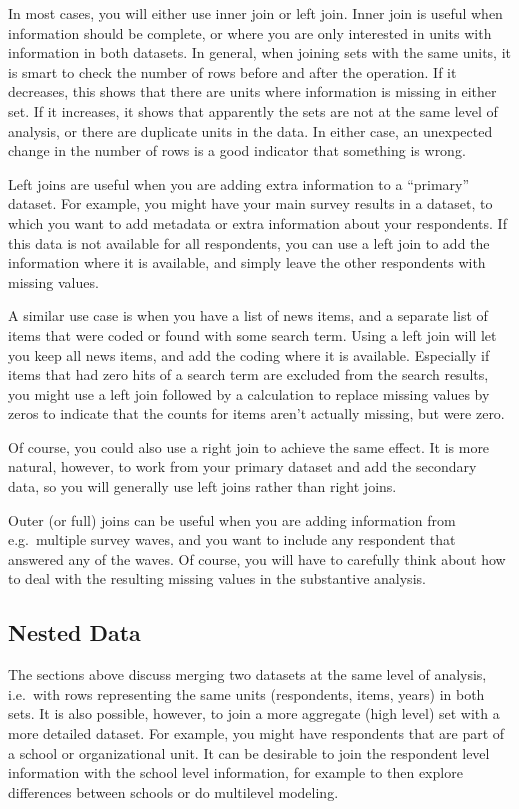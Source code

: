 In most cases, you will either use inner join or left join.
Inner join is useful when information should be complete,
or where you are only interested in units with information in both datasets.
In general, when joining sets with the same units, it is smart to check the number of rows before and after the operation.
If it decreases, this shows that there are units where information is missing in either set.
If it increases, it shows that apparently the sets are not at the same level of analysis,
or there are duplicate units in the data.
In either case, an unexpected change in the number of rows is a good indicator that something is wrong.

Left joins are useful when you are adding extra information to a ``primary'' dataset.
For example, you might have your main survey results in a dataset,
to which you want to add metadata or extra information about your respondents.
If this data is not available for all respondents, you can use a left join to add the information
where it is available, and simply leave the other respondents with missing values.


A similar use case is when you have a list of news items, and a separate list of items that were coded
or found with some search term. Using a left join will let you keep all news items, and add the coding where it is available.
Especially if items that had zero hits of a search term are excluded from the search results,
you might use a left join followed by a calculation to replace missing values by zeros to indicate that the counts for
items aren't actually missing, but were zero.

Of course, you could also use a right join to achieve the same effect.
It is more natural, however, to work from your primary dataset and add the secondary data,
so you will generally use left joins rather than right joins.

Outer (or full) joins can be useful when you are adding information from e.g.\ multiple survey waves,
and you want to include any respondent that answered any of the waves.
Of course, you will have to carefully think about how to deal with the resulting missing values in the substantive analysis.

\subsection{Nested Data}\label{sec:nested}

The sections above discuss merging two datasets at the same level of analysis,
i.e.\ with rows representing the same units (respondents, items, years) in both sets.
It is also possible, however, to join a more aggregate (high level) set with a more detailed dataset.
For example, you might have respondents that are part of a school or organizational unit.
It can be desirable to join the respondent level information with the school level information,
for example to then explore differences between schools or do multilevel modeling.

